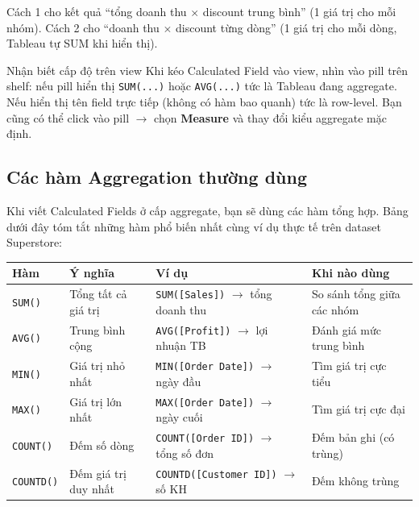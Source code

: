 \documentclass[12pt]{article}
\begin{document}
\noindent Cách 1 cho kết quả ``tổng doanh thu $\times$ discount trung bình'' (1 giá trị cho mỗi nhóm). Cách 2 cho ``doanh thu $\times$ discount từng dòng'' (1 giá trị cho mỗi dòng, Tableau tự SUM khi hiển thị).

\begin{guidelinebox}{Nhận biết cấp độ trên view}
Khi kéo Calculated Field vào view, nhìn vào pill trên shelf: nếu pill hiển thị \texttt{SUM(...)} hoặc \texttt{AVG(...)} tức là Tableau đang aggregate. Nếu hiển thị tên field trực tiếp (không có hàm bao quanh) tức là row-level. Bạn cũng có thể click vào pill $\rightarrow$ chọn \textbf{Measure} và thay đổi kiểu aggregate mặc định.
\end{guidelinebox}

\subsection{Các hàm Aggregation thường dùng}

\noindent Khi viết Calculated Fields ở cấp aggregate, bạn sẽ dùng các hàm tổng hợp. Bảng dưới đây tóm tắt những hàm phổ biến nhất cùng ví dụ thực tế trên dataset Superstore:

\begin{center}
\renewcommand{\arraystretch}{1.4}
\begin{tabularx}{\linewidth}{l l X X}
\toprule
\textbf{Hàm} & \textbf{Ý nghĩa} & \textbf{Ví dụ} & \textbf{Khi nào dùng} \\
\midrule
\texttt{SUM()} & Tổng tất cả giá trị & \texttt{SUM([Sales])} $\rightarrow$ tổng doanh thu & So sánh tổng giữa các nhóm \\
\texttt{AVG()} & Trung bình cộng & \texttt{AVG([Profit])} $\rightarrow$ lợi nhuận TB & Đánh giá mức trung bình \\
\texttt{MIN()} & Giá trị nhỏ nhất & \texttt{MIN([Order Date])} $\rightarrow$ ngày đầu & Tìm giá trị cực tiểu \\
\texttt{MAX()} & Giá trị lớn nhất & \texttt{MAX([Order Date])} $\rightarrow$ ngày cuối & Tìm giá trị cực đại \\
\texttt{COUNT()} & Đếm số dòng & \texttt{COUNT([Order ID])} $\rightarrow$ tổng số đơn & Đếm bản ghi (có trùng) \\
\texttt{COUNTD()} & Đếm giá trị duy nhất & \texttt{COUNTD([Customer ID])} $\rightarrow$ số KH & Đếm không trùng \\
\bottomrule
\end{tabularx}
\end{center}
\end{document}
